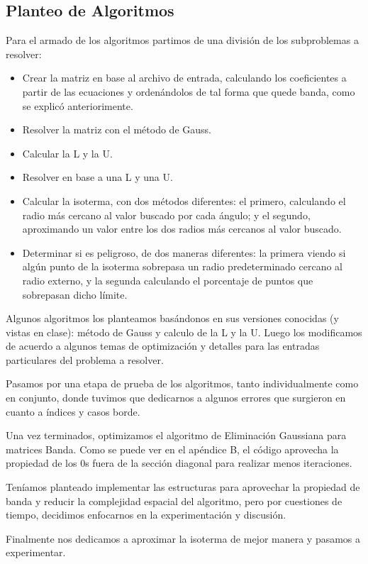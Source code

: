 \subsection{Planteo de Algoritmos}
\par Para el armado de los algoritmos partimos de una división de los subproblemas a resolver:
\begin{itemize}
\item Crear la matriz en base al archivo de entrada, calculando los coeficientes a partir de las ecuaciones y ordenándolos de tal forma que quede banda, como se explicó anteriorimente.
\item Resolver la matriz con el método de Gauss.
\item Calcular la L y la U.
\item Resolver en base a una L y una U.
\item Calcular la isoterma, con dos métodos diferentes: el primero, calculando el radio más cercano al valor buscado por cada ángulo; y el segundo, aproximando un valor entre los dos radios más cercanos al valor buscado.
\item Determinar si es peligroso, de dos maneras diferentes: la primera viendo si algún punto de la isoterma sobrepasa un radio predeterminado cercano al radio externo, y la segunda calculando el porcentaje de puntos que sobrepasan dicho límite. 
\end{itemize}

\par Algunos algoritmos los planteamos basándonos en sus versiones conocidas (y vistas en clase): método de Gauss y calculo de la L y la U. Luego los modificamos de acuerdo a algunos temas de optimización y detalles para las entradas particulares del problema a resolver.
\par Pasamos por una etapa de prueba de los algoritmos, tanto individualmente como en conjunto, donde tuvimos que dedicarnos a algunos errores que surgieron en cuanto a índices y casos borde.
\par Una vez terminados, optimizamos el algoritmo de Eliminación Gaussiana para matrices Banda. Como se puede ver en el apéndice B, el código aprovecha la propiedad de los 0s fuera de la sección diagonal para realizar menos iteraciones.
\par Teníamos planteado implementar las estructuras para aprovechar la propiedad de banda y reducir la complejidad espacial del algoritmo, pero por cuestiones de tiempo, decidimos enfocarnos en la experimentación y discusión.
\par Finalmente nos dedicamos a aproximar la isoterma de mejor manera y pasamos a experimentar. 

